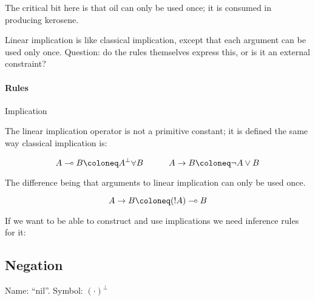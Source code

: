 \documentclass{article}
\begin{document}
The critical bit here is that oil can only be used once; it is
consumed in producing kerosene.

Linear implication is like classical implication, except that each
argument can be used only once. Question: do the rules themselves
express this, or is it an external constraint?

\paragraph{Rules} Implication

The linear implication operator is not a primitive constant; it is
defined the same way classical implication is:

\[A\lollipop B \coloneq A^\bot\fission B \hspace{3em} A\rightarrow B\coloneq \neg A\lor B\]

The difference being that arguments to linear implication can only be
used once.

\[A\rightarrow B \coloneq (\ofcourse A)\lollipop B\]


If we want to be able to construct and use implications we need inference
rules for it:


\subsection{Negation}


Name: ``nil''.  Symbol: \((\cdot)^{\bot}\)

\end{document}

